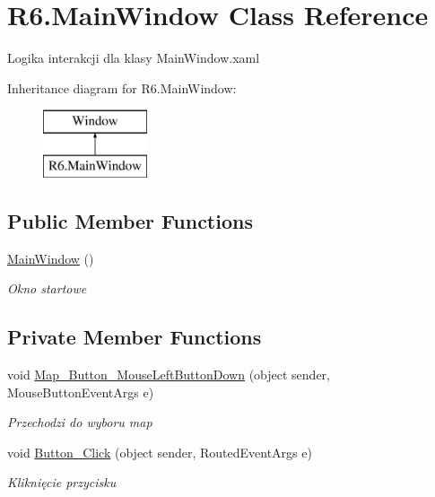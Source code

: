 \hypertarget{class_r6_1_1_main_window}{}\section{R6.\+Main\+Window Class Reference}
\label{class_r6_1_1_main_window}


Logika interakcji dla klasy Main\+Window.\+xaml  


Inheritance diagram for R6.\+Main\+Window\+:\begin{figure}[H]
\begin{center}
\leavevmode
\includegraphics[height=2.000000cm]{class_r6_1_1_main_window}
\end{center}
\end{figure}
\subsection*{Public Member Functions}
\begin{DoxyCompactItemize}
\item 
\mbox{\hyperlink{class_r6_1_1_main_window_a5328e43ff39764267c22525652530585}{Main\+Window}} ()
\begin{DoxyCompactList}\small\item\em Okno startowe \end{DoxyCompactList}\end{DoxyCompactItemize}
\subsection*{Private Member Functions}
\begin{DoxyCompactItemize}
\item 
void \mbox{\hyperlink{class_r6_1_1_main_window_a4c5be45f6208989f5ff9b7896d0fda78}{Map\+\_\+\+Button\+\_\+\+Mouse\+Left\+Button\+Down}} (object sender, Mouse\+Button\+Event\+Args e)
\begin{DoxyCompactList}\small\item\em Przechodzi do wyboru map \end{DoxyCompactList}\item 
void \mbox{\hyperlink{class_r6_1_1_main_window_af3ca3e5f108b9ec9cbe187df6d1d3e05}{Button\+\_\+\+Click}} (object sender, Routed\+Event\+Args e)
\begin{DoxyCompactList}\small\item\em Kliknięcie przycisku \end{DoxyCompactList}\end{DoxyCompactItemize}


